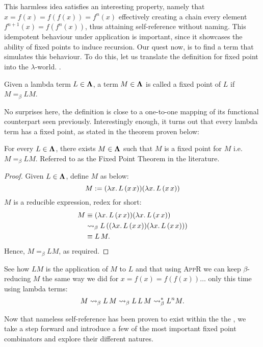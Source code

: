 \documentclass[12pt]{book}
\begin{document}
This harmless idea satisfies an interesting property, namely that $ x = f(x) = f(f(x)) = f^n(x) $ effectively creating a chain every element $ f^{n+1}(x) = f(f^{n}(x))$, thus attaining self-reference without naming. This idempotent behaviour under application is important, since it showcases the ability of fixed points to induce recursion. Our quest now, is to find a term that simulates this behaviour. To do this, let us translate the definition for fixed point into the $\lambda$-world.
.
\begin{definition}
  Given a lambda term \( L \in \mathbf{\Lambda} \), a term \( M \in \mathbf{\Lambda} \) is called a fixed point of \( L \) if \( M =_\beta L M \).
\end{definition}
No surprises here, the definition is close to a one-to-one mapping of its functional counterpart seen previously. Interestingly enough, it turns out that every lambda term has a fixed point, as stated in the theorem proven below:
\begin{theorem}
  For every \( L \in \mathbf{\Lambda} \), there exists \( M \in \mathbf{\Lambda} \) such that $ M $ is a fixed point for $ M $ i.e. $ M =_\beta L M $. Referred to as the Fixed Point Theorem in the literature.
\end{theorem}
\begin{proof} Given $L \in \mathbf{\Lambda}$, define $M$ as below:
  \[
    M := (\lambda x . \, L \, (x \, x))(\lambda x . \, L \, (x \, x))
  \]
  $M$ is a reducible expression, redex for short:
  \begin{align*}
    M 
    &\equiv (\lambda x . \, L \, (x \, x))(\lambda x . \, L \, (x \, x)) \\
    &\mathrel{\leadsto}_\beta L \, ((\lambda x . \, L \, (x \, x))(\lambda x . \, L\, (x \, x))) \\
    &\equiv L \, M.
  \end{align*}
  Hence, $ M =_\beta L M $, as required.
\end{proof}
\begin{remark}
  See how $ L M $ is the application of $ M $ to $ L $ and that using \textsc{AppR} we can keep $\beta$-reducing $ M $ the same way we did for $ x = f(x) = f(f(x))\dots $ only this time using lambda terms:
  \[
    M \mathrel{\leadsto}_\beta L \, M \mathrel{\leadsto}_\beta L \, L \, M \mathrel{\leadsto}_\beta^* L^n M.
  \]
\end{remark}
Now that nameless self-reference has been proven to exist within the the \lcalc, we take a step forward and introduce a few of the most important fixed point combinators and explore their different natures.
\end{document}
